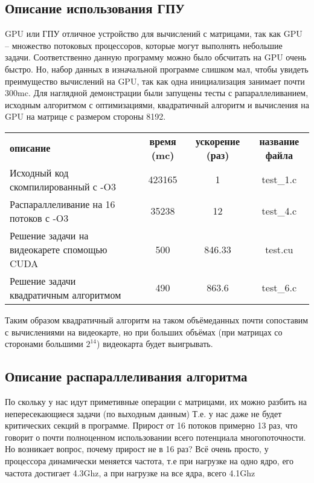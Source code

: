 \documentclass[a4peper, 12pt, titlepage, finall]{extreport}
\begin{document}
        \subsection{Описание использования ГПУ}
            GPU или ГПУ отличное устройство для вычислений с матрицами, так как GPU -- множество потоковых процессоров, которые могут выполнять небольшие задачи. Соответственно данную программу можно было обсчитать на GPU очень быстро.
            Но, набор данных в изначальной программе слишком мал, чтобы увидеть преимущество вычислений на GPU, так как одна инициализация занимает почти 300mc. 
            Для наглядной демонстрации были запущены тесты с рапараллеливанием, исходным алгоритмом с оптимизациями, квадратичный алгоритм и вычисления на GPU на матрице с размером стороны 8192.
            \begin{flushleft}
                \begin{tabular}{lccc}
                    \bf описание & \bf время (mc) & \bf ускорение (раз) &\bf название файла \\
                    Исходный код скомпилированный с {\ttfamily -O3} & 423165 & 1 & test\_1.c \\
                    Распараллеливание на 16 потоков с {\ttfamily -O3} & 35238 & 12 & test\_4.c \\
                    Решение задачи на видеокарете спомощью {\ttfamily CUDA} & 500 & 846.33 & test.cu \\
                    Решение задачи квадратичным алгоритмом & 490 & 863.6 & test\_6.c \\
                \end{tabular}
            \end{flushleft}

            Таким образом квадратичный алгоритм на таком объёмеданных почти сопоставим с вычислениями на видеокарте, но при больших объёмах (при матрицах со сторонами большими $2^{14}$) видеокарта будет выигрывать.
        
        \newpage
        \subsection{Описание распараллеливания алгоритма}
            По скольку у нас идут приметивные операции с матрицами, их можно разбить на непересекающиеся задачи (по выходным данным)
            Т.е. у нас даже не будет критических секций в программе. Прирост от 16 потоков примерно 13 раз, 
            что говорит о почти полноценном использовании всего потенциала многопоточности. Но возникает вопрос,
            почему прирост не в 16 раз? Всё очень просто, у процессора динамически меняется частота, т.е при нагрузке на одно ядро, его частота достигает 4.3Ghz,
            а при нагрузке на все ядра, всего 4.1Ghz
\end{document}
